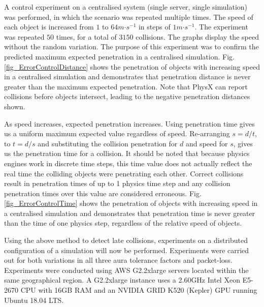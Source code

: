 A control experiment on a centralised system (single server, single simulation) was performed, in which the scenario was repeated multiple times. The speed of each object is increased from $1$ to $64m\mathord{\cdot}s^{-1}$ in steps of $1m\mathord{\cdot}s^{-1}$. The experiment was repeated $50$ times, for a total of $3150$ collisions. The graphs display the speed without the random variation. The purpose of this experiment was to confirm the predicted maximum expected penetration in a centralised simulation. Fig. \ref{fig_ErrorControlDistance} shows the penetration of objects with increasing speed in a centralised simulation and demonstrates that penetration distance is never greater than the maximum expected penetration. Note that PhysX can report collisions before objects intersect, leading to the negative penetration distances shown.

As speed increases, expected penetration increases. Using penetration time gives us a uniform maximum expected value regardless of speed.
Re-arranging $s=d/t$, to $t=d/s$ and substituting the collision penetration for $d$ and speed for $s$, gives us the penetration time for a collision. It should be noted that because physics engines work in discrete time steps, this time value does not actually reflect the real time the colliding objects were penetrating each other. Correct collisions result in penetration times of up to 1 physics time step and any collision penetration times over this value are considered erroneous. Fig. \ref{fig_ErrorControlTime} shows the penetration of objects with increasing speed in a centralised simulation and demonstrates that penetration time is never greater than the time of one physics step, regardless of the relative speed of objects.

Using the above method to detect late collisions, experiments on a distributed configuration of a simulation will now be performed. Experiments were carried out for both variations in all three aura tolerance factors and packet-loss. Experiments were conducted using AWS G2.2xlarge servers located within the same geographical region. A G2.2xlarge instance uses a 2.60GHz Intel Xeon E5-2670 CPU with 16GB RAM and an NVIDIA GRID K520 (Kepler) GPU running Ubuntu 18.04 LTS.


